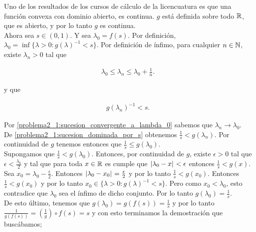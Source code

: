     Uno de los resultados de los cursos de cálculo de la licencuatura es que una función convexa con dominio abierto, es continua.
    $g$ está definida sobre todo $\mathbb{R}$, que es abierto, y por lo tanto $g$ es continua.\\
    
    Ahora sea $s \in (0,1)$. Y sea $\lambda_0 = f(s)$. Por definición, $\lambda_0 = \inf\{ \lambda > 0 : g(\lambda)^{-1} < s\}$. Por definición de ínfimo,
    para cualquier $n \in \mathbb{N}$, existe $\lambda_n > 0$ tal que 
    
    \begin{align}
        \lambda_0 \leq \lambda_n \leq \lambda_0 + \frac{1}{n}. \label{problema2_1:sucesion_convergente_a_lambda_0}
    \end{align}
     
    y que
    
    \begin{align}
        g(\lambda_n)^{-1} < s. \label{problema2_1:sucesion_dominada_por_s}
    \end{align}
    
    Por \eqref{problema2_1:sucesion_convergente_a_lambda_0} sabemos que $\lambda_n \rightarrow \lambda_0$.
    De \eqref{problema2_1:sucesion_dominada_por_s} obtenemos $\frac{1}{s} < g(\lambda_n)$. Por continuidad de $g$
    tenemos entonces que $\frac{1}{s} \leq g(\lambda_0)$.\\
    
    Supongamos que $\frac{1}{s} < g(\lambda_0)$. Entonces, por continuidad de $g$, existe $\epsilon > 0$ tal que
    $\epsilon < \frac{\lambda_0}{2}$ y tal que para toda $x \in \mathbb{R}$ es cumple que $\hspace{.25mm}\left|\lambda_0 - x\right|\hspace{.25mm} < \epsilon$ 
    entonces $\frac{1}{s} < g(x)$.\\
    
    Sea $x_0 = \lambda_0 - \frac{\epsilon}{2}$. Entonces $\hspace{.25mm}\left|\lambda_0 - x_0\right|\hspace{.25mm} = \frac{\epsilon}{2}$ y por lo tanto
    $\frac{1}{s}<g(x_0)$. Entonces $\frac{1}{s} < g(x_0)$ y por lo tanto $x_0 \in \{ \lambda > 0 : g(\lambda)^{-1} < s \}$.
    Pero como $x_0 < \lambda_0$, esto contradice que $\lambda_0$ sea el ínfimo de dicho conjunto. Por lo tanto
    $g(\lambda_0) = \frac{1}{s}$.\\
    
    De esto último, tenemos que $g(\lambda_0) = g(f(s)) = \frac{1}{s}$ y por lo tanto \\
    $\frac{1}{g(f(s))} = (\frac{1}{g}) \circ f (s) = s$ y con esto terminamos la demostración que buscábamos;